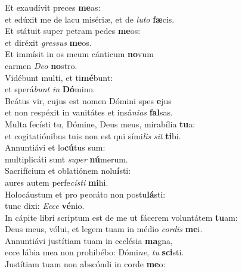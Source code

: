 \evenverse Et exaudívit preces \textbf{me}as:~\*\\
\evenverse et edúxit me de lacu misériæ, et de \textit{lu}\textit{to} \textbf{fæ}cis.\\
\oddverse Et státuit super petram pedes \textbf{me}os:~\*\\
\oddverse et diréxit \textit{gres}\textit{sus} \textbf{me}os.\\
\evenverse Et immísit in os meum cánticum \textbf{no}vum~\*\\
\evenverse carmen \textit{De}\textit{o} \textbf{no}stro.\\
\oddverse Vidébunt multi, et ti\textbf{mé}bunt:~\*\\
\oddverse et sperá\textit{bunt} \textit{in} \textbf{Dó}mino.\\
\evenverse Beátus vir, cujus est nomen Dómini spes \textbf{e}jus~\*\\
\evenverse et non respéxit in vanitátes et insá\textit{ni}\textit{as} \textbf{fal}sas.\\
\oddverse Multa fecísti tu, Dómine, Deus meus, mirabília \textbf{tu}a:~\*\\
\oddverse et cogitatiónibus tuis non est qui sími\textit{lis} \textit{sit} \textbf{ti}bi.\\
\evenverse Annuntiávi et lo\textbf{cú}tus sum:~\*\\
\evenverse multiplicáti sunt \textit{su}\textit{per} \textbf{nú}merum.\\
\oddverse Sacrifícium et oblatiónem nolu\textbf{í}sti:~\*\\
\oddverse aures autem perfe\textit{cí}\textit{sti} \textbf{mi}hi.\\
\evenverse Holocáustum et pro peccáto non postu\textbf{lá}sti:~\*\\
\evenverse tunc dixi: \textit{Ec}\textit{ce} \textbf{vé}nio.\\
\oddverse In cápite libri scriptum est de me ut fácerem voluntátem \textbf{tu}am:~\*\\
\oddverse Deus meus, vólui, et legem tuam in médio \textit{cor}\textit{dis} \textbf{me}i.\\
\evenverse Annuntiávi justítiam tuam in ecclésia \textbf{ma}gna,~\*\\
\evenverse ecce lábia mea non prohibébo: Dómi\textit{ne}, \textit{tu} \textbf{sci}sti.\\
\oddverse Justítiam tuam non abscóndi in corde \textbf{me}o:~\*\\
